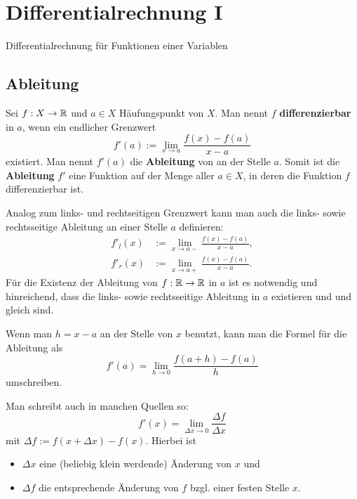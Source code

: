 \chapter{Differentialrechnung I}

Differentialrechnung für Funktionen einer Variablen

\section{Ableitung} 

\begin{defn}[Ableitung] 
	Sei $f : X \to \mathbb{R}$ und $a \in X$ Häufungspunkt von $X$. Man nennt $f$ \textbf{differenzierbar} in $a$, wenn ein endlicher Grenzwert
	\[
		f'(a) := \lim_{x \to a} \frac{f(x)-f(a)}{x-a}
	\]
	existiert. Man nennt $f'(a)$ die \textbf{Ableitung} von an der Stelle $a$. Somit ist die \textbf{Ableitung} $f'$ eine Funktion auf der Menge aller $a \in X$, in deren die Funktion $f$ differenzierbar ist. 
\end{defn} 

\begin{bem}
	Analog zum links- und rechtseitigen Grenzwert kann man auch die links- sowie rechtsseitige Ableitung an einer Stelle $a$ definieren: 
	\begin{align*}
			f'_l(x) & := \lim_{x \to a-} \frac{f(x)- f(a)}{x-a}, 
			\\ f'_r(x) & := \lim_{x \to a+} \frac{f(x) - f(a)}{x-a}. 
	\end{align*} 
	Für die Existenz der Ableitung von $f : \mathbb{R} \to \mathbb{R}$ in $a$ ist es notwendig und hinreichend, dass die links- sowie rechtsseitige Ableitung in $a$ existieren und und gleich sind. 
\end{bem} 

\begin{bem}
	Wenn man $h= x-a$ an der Stelle von $x$ benutzt, kann  man die Formel für die Ableitung als 
	\[
		f'(a) = \lim_{h \to 0} \frac{f(a+h) - f(a)}{h}
	\]
	umschreiben. 
	
	Man schreibt auch in manchen Quellen so: 
	\[
		f'(x) = \lim_{\Delta x \to 0} \frac{\Delta f}{\Delta x} 
	\]
	mit $\Delta f := f(x + \Delta x) - f(x)$. Hierbei ist 
	\begin{itemize} 
		\item[] $\Delta x$ eine (beliebig klein werdende) Änderung von $x$ und 
		\item[] $\Delta f$ die entsprechende Änderung von $f$ bzgl. einer festen Stelle $x$. 
	\end{itemize} 
\end{bem} 


